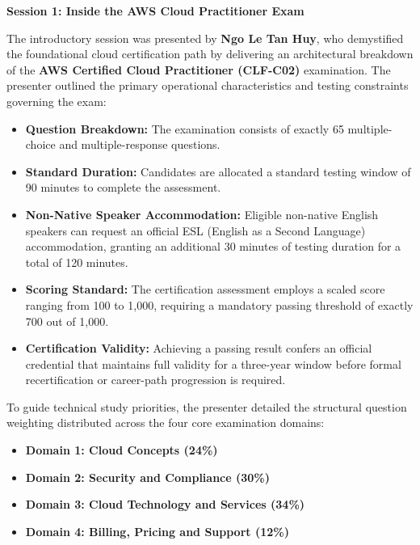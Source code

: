 \vspace{0.5em}\noindent\textbf{Session 1: Inside the AWS Cloud Practitioner
Exam}\par

The introductory session was presented by \textbf{Ngo Le Tan Huy}, who
demystified the foundational cloud certification path by delivering an
architectural breakdown of the \textbf{AWS Certified Cloud Practitioner
(CLF-C02)} examination. The presenter outlined the primary operational
characteristics and testing constraints governing the exam:

\begin{itemize}
\tightlist
\item
  \textbf{Question Breakdown:} The examination consists of exactly 65
  multiple-choice and multiple-response questions.
\item
  \textbf{Standard Duration:} Candidates are allocated a standard
  testing window of 90 minutes to complete the assessment.
\item
  \textbf{Non-Native Speaker Accommodation:} Eligible non-native English
  speakers can request an official ESL (English as a Second Language)
  accommodation, granting an additional 30 minutes of testing duration
  for a total of 120 minutes.
\item
  \textbf{Scoring Standard:} The certification assessment employs a
  scaled score ranging from 100 to 1,000, requiring a mandatory passing
  threshold of exactly 700 out of 1,000.
\item
  \textbf{Certification Validity:} Achieving a passing result confers an
  official credential that maintains full validity for a three-year
  window before formal recertification or career-path progression is
  required.
\end{itemize}

To guide technical study priorities, the presenter detailed the
structural question weighting distributed across the four core
examination domains:

\begin{itemize}
\tightlist
\item
  \textbf{Domain 1: Cloud Concepts (24\%)}
\item
  \textbf{Domain 2: Security and Compliance (30\%)}
\item
  \textbf{Domain 3: Cloud Technology and Services (34\%)}
\item
  \textbf{Domain 4: Billing, Pricing and Support (12\%)}
\end{itemize}

